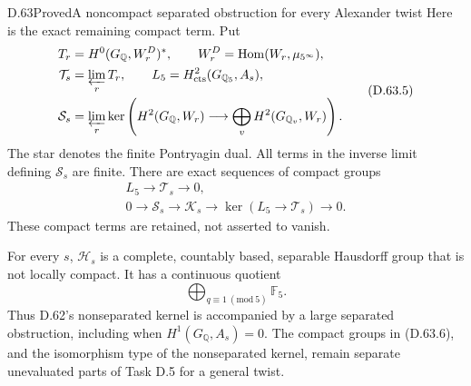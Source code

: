 \begin{statement}{D.63}{Proved}{A noncompact separated obstruction for every Alexander twist}
Here is the exact remaining compact term. Put
\[
 \begin{split}
 T_r&=H^0(G_{\mathbb Q},W_r^D)^*,\qquad
 W_r^D=\operatorname{Hom}(W_r,\mu_{5^\infty}),\\
 \mathcal T_s&=\varprojlim_r T_r,
 \qquad L_5=H^2_{\mathrm{cts}}(G_{\mathbb Q_5},A_s),\\
 \mathcal S_s&=\varprojlim_r
   \ker\left(H^2(G_{\mathbb Q},W_r)
                   \longrightarrow\bigoplus_vH^2(G_{\mathbb Q_v},W_r)\right).
 \end{split}                                             \tag{D.63.5}
\]
The star denotes the finite Pontryagin dual. All terms
in the inverse limit defining \(\mathcal S_s\) are finite.
There are exact sequences of compact groups
\[
 \begin{gathered}
 L_5\longrightarrow\mathcal T_s\longrightarrow0,\\
 0\longrightarrow\mathcal S_s\longrightarrow\mathcal K_s
     \longrightarrow\ker(L_5\longrightarrow\mathcal T_s)
     \longrightarrow0.
 \end{gathered}                                         \tag{D.63.6}
\]
These compact terms are retained, not asserted to vanish.

For every \(s\), \(\mathcal H_s\) is a complete,
countably based, separable Hausdorff group that is not
locally compact. It has a continuous quotient
\[
           \bigoplus_{q\equiv1\ (\mathrm{mod}\ 5)}\mathbb F_5.
                                                        \tag{D.63.7}
\]
Thus D.62's nonseparated kernel is accompanied by a large
separated obstruction, including when \(H^1(G_{\mathbb Q},A_s)=0\).
The compact groups in (D.63.6), and the isomorphism type of
the nonseparated kernel, remain separate unevaluated parts
of Task D.5 for a general twist.
\end{statement}

